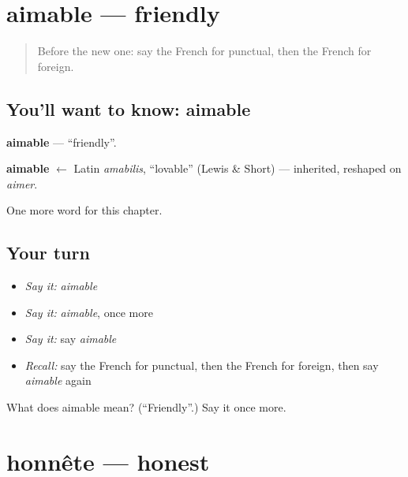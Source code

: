 \section[aimable]{aimable — friendly}

\label{lesson:FR-C220-aimable}



\begin{quote}
Before the new one: say the French for punctual, then the French for foreign.
\end{quote}

\subsection*{You'll want to know: aimable}
\textbf{aimable} — \textquotedblleft{}friendly\textquotedblright{}.

\begin{cousinweb}
\textbf{aimable} $\leftarrow$ Latin \emph{amabilis}, \textquotedblleft{}lovable\textquotedblright{} (Lewis \& Short) — inherited, reshaped on \emph{aimer}.
\end{cousinweb}

\begin{grammarlens}[title={What you've built}]
One more word for this chapter.
\end{grammarlens}

\subsection*{Your turn}
\begin{itemize}
\raggedright
  \item \emph{Say it:} \emph{aimable}
  \item \emph{Say it:} \emph{aimable}, once more
  \item \emph{Say it:} say \emph{aimable}
  \item \emph{Recall:} say the French for punctual, then the French for foreign, then say \emph{aimable} again
\end{itemize}

\begin{tcolorbox}[breakable,colback=teal!4,colframe=teal!35!black,title={Before you move on}]
What does aimable mean? (\textquotedblleft{}Friendly\textquotedblright{}.) Say it once more.
\end{tcolorbox}
\section[honnête]{honnête — honest}

